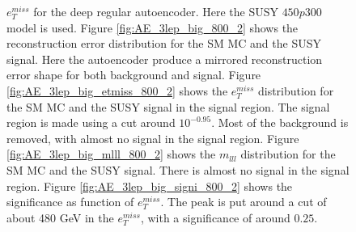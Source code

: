 \begin{figure}[H]
{    $e_T^{miss}$ for the deep regular autoencoder. Here the SUSY $450p300$ model is used.
    Figure \ref{fig:AE_3lep_big_800_2} shows the reconstruction error 
    distribution for the SM MC and the SUSY signal. Here the autoencoder produce a mirrored reconstruction error shape for both background and 
    signal. Figure \ref{fig:AE_3lep_big_etmiss_800_2} shows the $e_T^{miss}$ distribution for the SM MC and the SUSY signal in the signal region. 
    The signal region is made using a cut around $10^{-0.95}$. Most of the background is removed, with almost no signal in the signal region.
    Figure \ref{fig:AE_3lep_big_mlll_800_2} shows the $m_{lll}$ distribution for the SM MC and the SUSY signal. 
    There is almost no signal in the signal region. Figure \ref{fig:AE_3lep_big_signi_800_2} shows the significance as function of
    $e_T^{miss}$. The peak is put around a cut of about 480 GeV in the $e_T^{miss}$, with a significance of around $0.25$.}
    \label{fig:AE_3lep_big_rec_sig_signi_800_2}
\end{figure}

